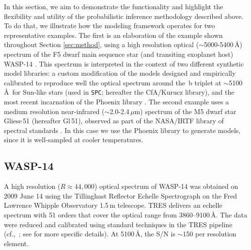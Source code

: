 \documentclass[iop,floatfix,twocolappendix]{emulateapj}
\begin{document}
In this section, we aim to demonstrate the functionality and highlight the flexibility and utility 
of the probabilistic inference methodology described above.  To do that, we illustrate how the 
modeling framework operates for two representative examples.  The first is an elaboration of the 
example shown throughout Section \ref{sec:method}, using a high resolution optical 
($\sim$5000-5400\,\AA) spectrum of the F5 dwarf main sequence star (and transiting exoplanet host) 
WASP-14 \citep{joshi09,torres12}.  This spectrum is interpreted in the context of two different 
synthetic model libraries: a custom modification of the \citet{castelli04} models designed and 
empirically calibrated to reproduce well the optical spectrum around the \,b triplet at 
$\sim$5100\,\AA\ for Sun-like stars (used in {\tt SPC}; hereafter the {\sc CfA/Kurucz} library), 
and the most recent incarnation of the {\sc Phoenix} library \citep{husser13}.  The second 
example uses a medium resolution near-infrared ($\sim$2.0-2.4\,$\mu$m) spectrum of the M5 dwarf 
star Gliese\,51 (hereafter Gl\,51), observed as part of the NASA/IRTF library of spectral standards 
\citep{cushing05,rayner09}.  In this case we use the {\sc Phoenix} library to generate models, 
since it is well-sampled at cooler temperatures.


\subsection{WASP-14} \label{subsec:wasp}

A high resolution ($R\approx44,000$) optical spectrum of WASP-14 was obtained on 2009 June 14 
using the Tillinghast Reflector Echelle Spectrograph \citep[TRES;][]{furesz08} on the Fred Lawrence 
Whipple Observatory 1.5\,m telescope.  TRES delivers an echelle spectrum with 51 orders that cover 
the optical range from 3860--9100\,\AA.  The data were reduced and calibrated using standard 
techniques in the TRES pipeline (cf.,~\citealt{buchhave10}; see \citealt{torres12} for more 
specific details).  At 5100\,\AA, the S/N is $\sim$150 per resolution element.  
\end{document}
